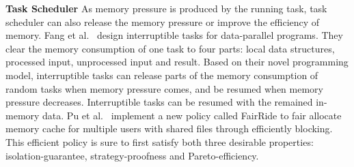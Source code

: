 \textbf{Task Scheduler} As memory pressure is produced by the running task, task scheduler can also release the memory pressure or improve the efficiency of memory. Fang et al.~\cite{fang2015interruptible} design interruptible tasks for data-parallel programs. They clear the memory consumption of one task to four parts: local data structures, processed input, unprocessed input and result. Based on their novel programming model, interruptible tasks can release parts of the memory consumption of random tasks when memory pressure comes, and be resumed when memory pressure decreases. Interruptible tasks can be resumed with the remained in-memory data. Pu et al.~\cite{pu2016fairride} implement a new policy called FairRide to fair allocate memory cache for multiple users with shared files through efficiently blocking. This efficient policy is sure to first satisfy both three desirable properties: isolation-guarantee, strategy-proofness and Pareto-efficiency.
